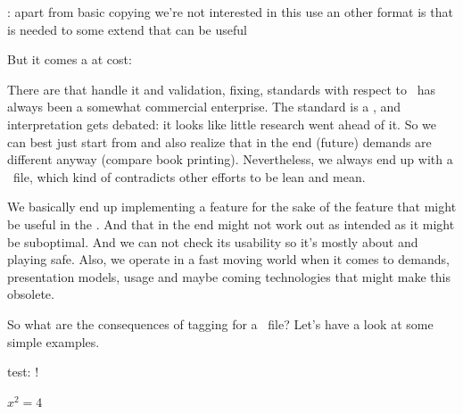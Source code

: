 \startitemize
\startitem
    : apart from basic copying we're not
    interested in this
\stopitem
\startitem
     use an other format is that is needed
\stopitem
\startitem
     to some extend that can be useful
\stopitem
\stopitemize

But it comes a at cost:

\startitemize
\startitem
    There are  that handle it and validation, fixing,
    standards with respect to \PDF\ has always been a somewhat commercial enterprise.
\stopitem
\startitem
    The standard is a , and interpretation gets debated: it
    looks like little research went ahead of it.
\stopitem
\startitem
    So we can best just start from  and also
    realize that in the end (future) demands are different anyway (compare book
    printing).
\stopitem
\startitem
    Nevertheless, we always end up with a  \PDF\ file, which
    kind of contradicts other efforts to be lean and mean.
\stopitem
\stopitemize

\stoptitle

\starttitle[title=And so \unknown]

\startitemize
\startitem
    We basically end up implementing a feature for the sake of the feature that might
    be useful in the .
\stopitem
\startitem
    And that in the end might not work out as intended as it might be \notabene
    {suboptimal}.
\stopitem
\startitem
    And we can not check its usability so it's mostly about 
    and playing safe.
\stopitem
\startitem
    Also, we operate in a fast moving world when it comes to demands, presentation
    models, usage and maybe coming technologies that might make this \notabene
    {obsolete}.
\stopitem
\stopitemize

\stoptitle

\starttitle[title=Examples]

So what are the consequences of tagging for a \PDF\ file? Let's have a look at
some simple examples.

\blank[2*big]

 test:  !

\blank[2*big]

 $x^2 = 4$

\blank[2*big]

